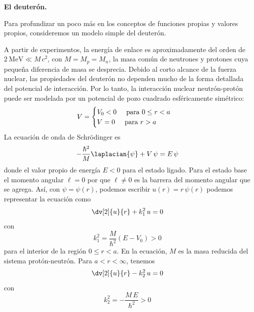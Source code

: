 \begin{ejemplo}{\textbf{El deuterón.}}

Para profundizar un poco más en los conceptos de funciones propias y valores propios, consideremos un modelo simple del deuterón.
\par
A partir de experimentos, la energía de enlace es aproximadamente del orden de $\SI{2}{\mega \electronvolt} \ll M \, c^{2} $, con $M = M_{p} = M_{n}$, la masa común de neutrones y protones cuya pequeña diferencia de masa se desprecia. Debido al corto alcance de la fuerza nuclear, las propiedades del deuterón no dependen mucho de la forma detallada del potencial de interacción. Por lo tanto, la interacción nuclear neutrón-protón puede ser modelada por un potencial de pozo cuadrado esféricamente simétrico: 
\begin{equation}
V = \begin{cases}
V_{0} < 0 \hspace{0.5cm} \text{para } 0 \leq r < a \\
V = 0 \hspace{0.5cm} \text{para } r > a
\end{cases}
\end{equation}
La ecuación de onda de Schrödinger es
\begin{equation}
- \dfrac{\hbar^{2}}{M} \laplacian{\psi} + V \, \psi =  E \, \psi
\label{eq:ecuacion_10_10}
\end{equation}
donde el valor propio de energía $E < 0$ para el estado ligado. Para el estado base el momento angular $ \ell = 0$ por que $\ell \neq 0$ es la barrera del momento angular que se agrega. Así, con $\psi =  \psi(r)$, podemos escribir $u(r) = r \, \psi (r)$ podemos representar la ecuación como
\begin{equation}
\dv[2]{u}{r} + k_{1}^{2} \, u = 0
\label{eq:ecuacion_10_11}
\end{equation}
con
\begin{equation}
k_{1}^{2} =  \dfrac{M}{\hbar^{2}} (E - V_{0}) > 0
\label{eq:ecuacion_10_12}
\end{equation}
para el interior de la región $0 \leq r < a$. En la ecuación, $M$ es la masa reducida del sistema protón-neutrón. Para $a < r < \infty$, tenemos
\begin{equation}
\dv[2]{u}{r} - k_{2}^{2} \, u = 0
\label{eq:ecuacion_10_13}
\end{equation}
con
\begin{equation}
k_{2}^{2} = - \dfrac{M \, E}{\hbar^{2}} > 0
\label{eq:ecuacion_10_14}
\end{equation}

\end{ejemplo}
